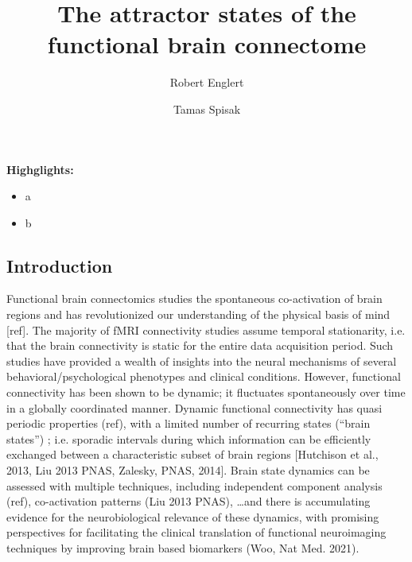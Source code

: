 \documentclass[twocolumn, switch]{article}
\title{The attractor states of the functional brain connectome}
\author[1\thanks{\texttt{robert.englert@uk-essen.de}}]{Robert Englert}
\author[1\thanks{\texttt{tamas.spisak@uk-essen.de}}]{Tamas Spisak}
\affil[1]{University Medicine Essen}
\begin{document}


\textbf{Highglights:}

\begin{itemize}
\item a
\item b
\end{itemize}

\subsection{Introduction}\label{Introduction}

Functional brain connectomics studies the spontaneous co-activation of brain regions and has revolutionized our understanding of the physical basis of mind [ref]. The majority of fMRI connectivity studies assume temporal stationarity, i.e. that the brain connectivity is static for the entire data acquisition period. Such studies have provided a wealth of insights into the neural mechanisms of several behavioral/psychological phenotypes and clinical conditions. However, functional connectivity has been shown to be dynamic; it fluctuates spontaneously over time in a globally coordinated manner. Dynamic functional connectivity has quasi periodic properties (ref), with a limited number of recurring states (``brain states'') \cite{Gutierrez_Barragan_2019}; i.e. sporadic intervals during which information can be efficiently exchanged between a characteristic subset of brain regions [Hutchison et al., 2013, Liu 2013 PNAS, Zalesky, PNAS, 2014]. Brain state dynamics can be assessed with multiple techniques, including independent component analysis (ref), co-activation patterns (Liu 2013 PNAS), \dots and there is accumulating evidence for the neurobiological relevance of these dynamics, with promising perspectives for facilitating the clinical translation of functional neuroimaging techniques by improving brain based biomarkers (Woo, Nat Med. 2021).
\end{document}
